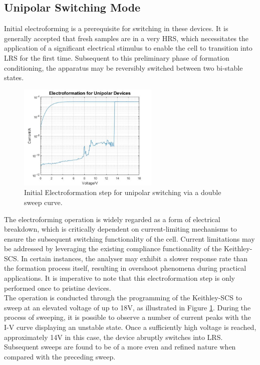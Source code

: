 \subsection[Unipolar Switching Mode]{Unipolar Switching Mode}

\noindent Initial electroforming is a prerequisite for switching in these devices. It is generally accepted that fresh samples are in a very HRS, which necessitates the application of a significant electrical stimulus to enable the cell to transition into LRS for the first time. Subsequent to this preliminary phase of formation conditioning, the apparatus may be reversibly switched between two bi-stable states. \\

\begin{figure}[htbp!] 
    \centering    
    \includegraphics[width=0.6\textwidth]{Chapter3/Figs/g.png}
    \caption[Initial Electroformation step for unipolar switching.]{Initial Electroformation step for unipolar switching via a double sweep curve.}
    \label{fig:3g}
\end{figure}

\noindent The electroforming operation is widely regarded as a form of electrical breakdown, which is critically dependent on current-limiting mechanisms to ensure the subsequent switching functionality of the cell. Current limitations may be addressed by leveraging the existing compliance functionality of the Keithley-SCS. In certain instances, the analyser may exhibit a slower response rate than the formation process itself, resulting in overshoot phenomena during practical applications. It is imperative to note that this electroformation step is only performed once to pristine devices. \\

\noindent The operation is conducted through the programming of the Keithley-SCS to sweep at an elevated voltage of up to 18V, as illustrated in Figure \ref{fig:3g}. During the process of sweeping, it is possible to observe a number of current peaks with the I-V curve displaying an unstable state. Once a sufficiently high voltage is reached, approximately 14V in this case, the device abruptly switches into LRS. Subsequent sweeps are found to be of a more even and refined nature when compared with the preceding sweep. \\

